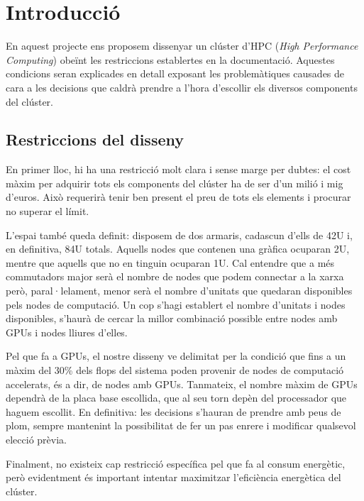 \section{Introducció}

En aquest projecte ens proposem dissenyar un clúster d'HPC (\textit{High Performance Computing}) obeïnt les restriccions establertes en la documentació. Aquestes condicions seran explicades en detall exposant les problemàtiques causades de cara a les decisions que caldrà prendre a l'hora d'escollir els diversos components del clúster.

\subsection{Restriccions del disseny}
En primer lloc, hi ha una restricció molt clara i sense marge per dubtes: el cost màxim per adquirir tots els components del clúster ha de ser d'un milió i mig d'euros. Això requerirà tenir ben present el preu de tots els elements i procurar no superar el límit.

L'espai també queda definit: disposem de dos armaris, cadascun d'ells de 42U i, en definitiva, 84U totals. Aquells nodes que contenen una gràfica ocuparan 2U, mentre que aquells que no en tinguin ocuparan 1U. Cal entendre que a més commutadors major serà el nombre de nodes que podem connectar a la xarxa però, paral·lelament, menor serà el nombre d'unitats que quedaran disponibles pels nodes de computació. Un cop s'hagi establert el nombre d'unitats i nodes disponibles, s'haurà de cercar la millor combinació possible entre nodes amb GPUs i nodes lliures d'elles.

Pel que fa a GPUs, el nostre disseny ve delimitat per la condició que fins a un màxim del 30\% dels flops del sistema poden provenir de nodes de computació accelerats, és a dir, de nodes amb GPUs. Tanmateix, el nombre màxim de GPUs dependrà de la placa base escollida, que al seu torn depèn del processador que haguem escollit. En definitiva: les decisions s'hauran de prendre amb peus de plom, sempre mantenint la possibilitat de fer un pas enrere i modificar qualsevol elecció prèvia.

Finalment, no existeix cap restricció específica pel que fa al consum energètic, però evidentment és important intentar maximitzar l'eficiència energètica del clúster. 


